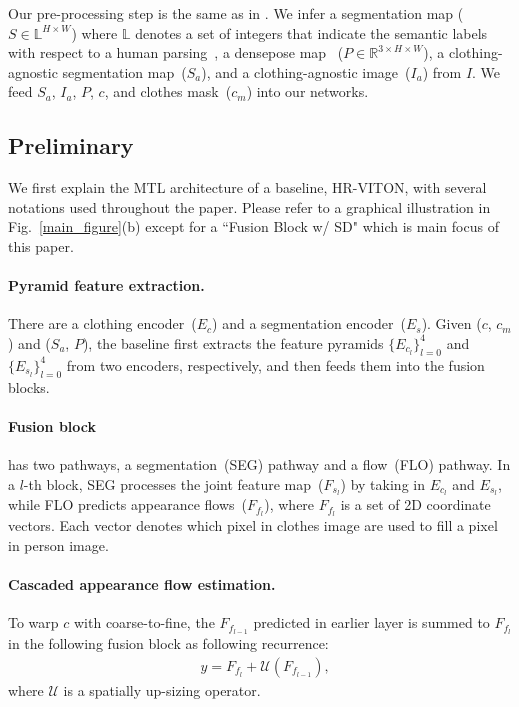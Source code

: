 \documentclass[letterpaper]{article} %
\begin{document}
Our pre-processing step is the same as in \cite{lee2022hrviton,choi2021viton}.
We infer a segmentation map ($S \in \mathbb{L}^{H\times W}$) where $\mathbb{L}$ denotes a set of integers that indicate the semantic labels with respect to a human parsing~\cite{gong2018instance}, a densepose map~\cite{guler2018densepose} ($P \in \mathbb{R}^{3 \times H\times W}$), a clothing-agnostic segmentation map~($S_a$), and a clothing-agnostic image~($I_a$) from $I$.
We feed $S_a$, $I_a$, $P$, $c$, and clothes mask~($c_m$) into our networks.

\subsection{Preliminary}
We first explain the MTL architecture of a baseline, HR-VITON, with several notations used throughout the paper.
Please refer to a graphical illustration in Fig.~\ref{main_figure}(b) except for a ``Fusion Block w/ SD" which is main focus of this paper.

\paragraph{Pyramid feature extraction.}
There are a clothing encoder~($E_c$) and a segmentation encoder~($E_s$).
Given ($c$, $c_m$) and ($S_a$, $P$), the baseline first extracts the feature pyramids $\{E_{c_l}\}_{l=0}^{4}$ and $\{E_{s_l}\}_{l=0}^{4}$ from two encoders, respectively, and then feeds them into the fusion blocks.

\paragraph{Fusion block} has two pathways, a segmentation~(SEG) pathway and a flow~(FLO) pathway.
In a $l$-th block, SEG processes the joint feature map~($F_{s_l}$) by taking in $E_{c_l}$ and $E_{s_l}$, while FLO predicts appearance flows~($F_{f_l}$), where $F_{f_l}$ is a set of 2D coordinate vectors.
Each vector denotes which pixel in clothes image are used to fill a pixel in person image.

\paragraph{Cascaded appearance flow estimation.}
To warp $c$ with coarse-to-fine, the $F_{f_{l-1}}$ predicted in earlier layer is summed to $F_{f_{l}}$ in the following fusion block as following recurrence:
\begin{eqnarray}
    & y = F_{f_{l}} + \mathcal{U}(F_{f_{l-1}}),
    \label{eq_recursive}
\end{eqnarray}
where $\mathcal{U}$ is a spatially up-sizing operator.
\end{document}
